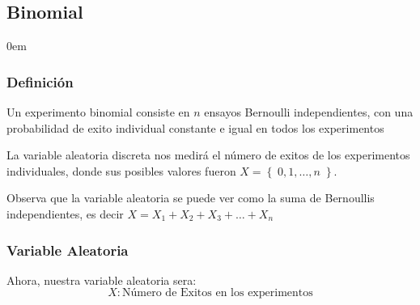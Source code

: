 \documentclass[12pt, fleqn]{report}                             %
\newenvironment{SmallIndentation}[1][0.75em]                    %
        {\begin{adjustwidth}{#1}{}\begin{footnotesize}}             %
        {\end{footnotesize}\end{adjustwidth}}                       %
\theoremstyle{break}                                            %
\newcommand{\Set}[1]{\left\{ \; #1 \; \right\}}                 %
\begin{document}
            \clearpage
            \subsection{Binomial}

                \begin{multicols}{2}
                \begin{SmallIndentation}[0em]

                    \subsubsection{Definición}

                        Un experimento binomial consiste en $n$ ensayos Bernoulli
                        independientes, con una probabilidad de exito individual constante e igual en 
                        todos los experimentos

                        La variable aleatoria discreta nos medirá el número de exitos de los experimentos individuales,
                        donde sus posibles valores fueron $X = \Set{0, 1, \dots, n}$.

                        Observa que la variable aleatoria se puede ver como la suma de Bernoullis independientes,
                        es decir $X = X_1 + X_2 + X_3 + \dots + X_n$

                        \subsubsection{Variable Aleatoria}

                            Ahora, nuestra variable aleatoria sera:
                            \begin{equation*}
                                X : \text{Número de Exitos en los experimentos}
                            \end{equation*}


\end{SmallIndentation}
\end{multicols}
\end{document}

